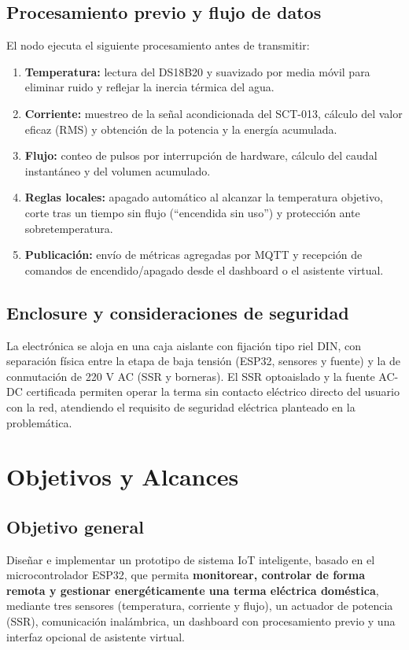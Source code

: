 \documentclass[11pt,a4paper]{article}
\begin{document}
\subsection{Procesamiento previo y flujo de datos}
El nodo ejecuta el siguiente procesamiento antes de transmitir:
\begin{enumerate}
  \item \textbf{Temperatura:} lectura del DS18B20 y suavizado por media móvil para eliminar ruido y reflejar la inercia térmica del agua.
  \item \textbf{Corriente:} muestreo de la señal acondicionada del SCT-013, cálculo del valor eficaz (RMS) y obtención de la potencia y la energía acumulada.
  \item \textbf{Flujo:} conteo de pulsos por interrupción de hardware, cálculo del caudal instantáneo y del volumen acumulado.
  \item \textbf{Reglas locales:} apagado automático al alcanzar la temperatura objetivo, corte tras un tiempo sin flujo (``encendida sin uso'') y protección ante sobretemperatura.
  \item \textbf{Publicación:} envío de métricas agregadas por MQTT y recepción de comandos de encendido/apagado desde el dashboard o el asistente virtual.
\end{enumerate}

\subsection{Enclosure y consideraciones de seguridad}
La electrónica se aloja en una caja aislante con fijación tipo riel DIN, con separación física entre la etapa de baja tensión (ESP32, sensores y fuente) y la de conmutación de 220 V AC (SSR y borneras). El SSR optoaislado y la fuente AC-DC certificada permiten operar la terma sin contacto eléctrico directo del usuario con la red, atendiendo el requisito de seguridad eléctrica planteado en la problemática.

\section{Objetivos y Alcances}
\label{sec:objetivos}

\subsection*{Objetivo general}
Diseñar e implementar un prototipo de sistema IoT inteligente, basado en el microcontrolador ESP32, que permita \textbf{monitorear, controlar de forma remota y gestionar energéticamente una terma eléctrica doméstica}, mediante tres sensores (temperatura, corriente y flujo), un actuador de potencia (SSR), comunicación inalámbrica, un dashboard con procesamiento previo y una interfaz opcional de asistente virtual.
\end{document}
